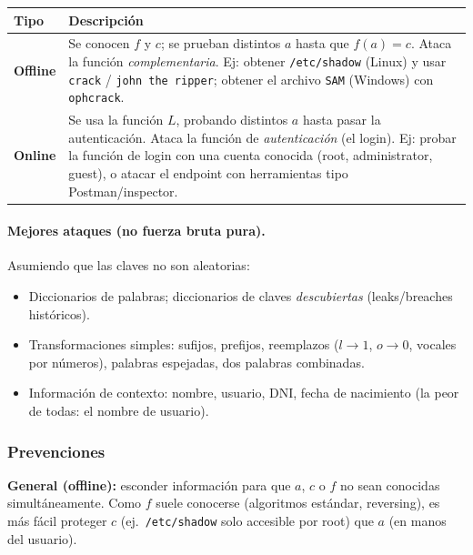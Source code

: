\documentclass[../main.tex]{subfiles}
\begin{document}
\begin{center}
\begin{tabular}{l p{10.5cm}}
\toprule
\textbf{Tipo} & \textbf{Descripción} \\
\midrule
\textbf{Offline} & Se conocen $f$ y $c$; se prueban distintos $a$ hasta que $f(a)=c$. Ataca la función \emph{complementaria}. Ej: obtener \texttt{/etc/shadow} (Linux) y usar \texttt{crack} / \texttt{john the ripper}; obtener el archivo \texttt{SAM} (Windows) con \texttt{ophcrack}. \\
\textbf{Online} & Se usa la función $L$, probando distintos $a$ hasta pasar la autenticación. Ataca la función de \emph{autenticación} (el login). Ej: probar la función de login con una cuenta conocida (root, administrator, guest), o atacar el endpoint con herramientas tipo Postman/inspector. \\
\bottomrule
\end{tabular}
\end{center}

\paragraph{Mejores ataques (no fuerza bruta pura).} Asumiendo que las claves no son aleatorias:
\begin{itemize}[itemsep=1pt]
  \item Diccionarios de palabras; diccionarios de claves \emph{descubiertas} (leaks/breaches históricos).
  \item Transformaciones simples: sufijos, prefijos, reemplazos ($l\to1$, $o\to0$, vocales por números), palabras espejadas, dos palabras combinadas.
  \item Información de contexto: nombre, usuario, DNI, fecha de nacimiento (la peor de todas: el nombre de usuario).
\end{itemize}

\subsubsection{Prevenciones}

\textbf{General (offline):} esconder información para que $a$, $c$ o $f$ no sean conocidas simultáneamente. Como $f$ suele conocerse (algoritmos estándar, reversing), es más fácil proteger $c$ (ej.\ \texttt{/etc/shadow} solo accesible por root) que $a$ (en manos del usuario).
\end{document}
